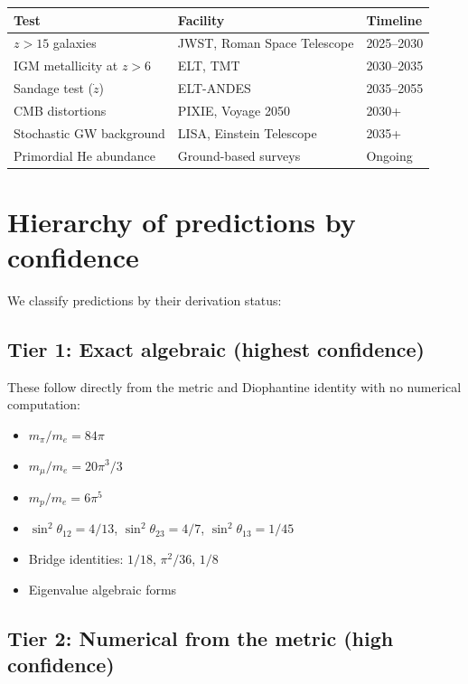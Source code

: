 \documentclass[11pt,letterpaper]{article}
\numberwithin{equation}{section}
\begin{document}
\begin{longtable}{p{4cm}p{4cm}p{3.5cm}}
\toprule
Test & Facility & Timeline \\
\midrule
\endfirsthead
$z > 15$ galaxies & JWST, Roman Space Telescope & 2025--2030 \\
IGM metallicity at $z > 6$ & ELT, TMT & 2030--2035 \\
Sandage test ($\dot{z}$) & ELT-ANDES & 2035--2055 \\
CMB distortions & PIXIE, Voyage 2050 & 2030+ \\
Stochastic GW background & LISA, Einstein Telescope & 2035+ \\
Primordial He abundance & Ground-based surveys & Ongoing \\
\bottomrule
\end{longtable}

\section{Hierarchy of predictions by confidence}
\label{sec:hierarchy}

We classify predictions by their derivation status:

\subsection{Tier 1: Exact algebraic (highest confidence)}

These follow directly from the metric and Diophantine identity with no
numerical computation:
\begin{itemize}
  \item $m_\pi/m_e = 84\pi$
  \item $m_\mu/m_e = 20\pi^3/3$
  \item $m_p/m_e = 6\pi^5$
  \item $\sin^2\theta_{12} = 4/13$, $\sin^2\theta_{23} = 4/7$,
    $\sin^2\theta_{13} = 1/45$
  \item Bridge identities: $1/18$, $\pi^2/36$, $1/8$
  \item Eigenvalue algebraic forms
\end{itemize}

\subsection{Tier 2: Numerical from the metric (high confidence)}
\end{document}
